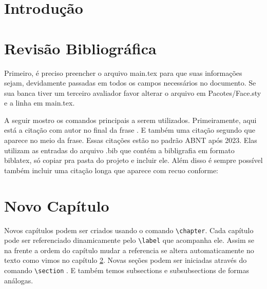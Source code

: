 
\chapter{Introdução} \label{intro}

\lipsum[2]


\chapter{Revisão Bibliográfica} \label{revisao}

Primeiro, é preciso preencher o arquivo main.tex para que suas informações sejam, devidamente passadas em todos os campos necessários no documento. Se sua banca tiver um terceiro avaliador favor alterar o arquivo em Pacotes/Face.sty e a linha em main.tex.

A seguir mostro os comandos principais a serem utilizados. Primeiramente, aqui está a citação com autor no final da frase \cite{nome_facil}. E também uma citação segundo \textcite{nome_facil} que aparece no meio da frase. Essas citações estão no padrão ABNT após 2023. Elas utilizam as entradas do arquivo .bib que contém a bibligrafia em formato biblatex, só copiar pra pasta do projeto e incluir ele. Além disso é sempre possível também incluir uma citação longa que aparece com recuo conforme:

\begin{quote}
    \lipsum[3] \cite{nome_facil}
\end{quote}

\chapter{Novo Capítulo}\label{novo}
Novos capítulos podem ser criados usando o comando \verb!\chapter!. Cada capítulo pode ser referenciado dinamicamente pelo \verb!\label! que acompanha ele. Assim se na frente a ordem do capítulo mudar a referencia se altera automaticamente no texto como vimos no capítulo \ref{revisao}. Novas seções podem ser iniciadas através do comando \verb!\section! . E também temos subsections e subsubsections de formas análogas.


